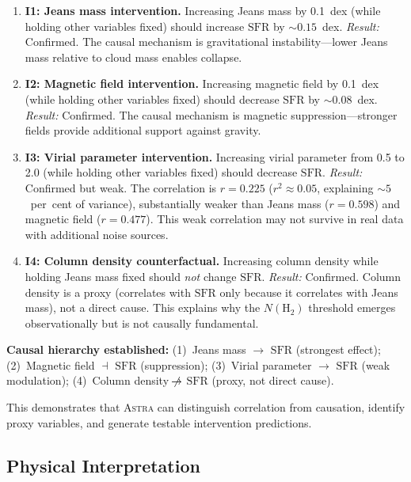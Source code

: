 \documentclass[fleqn,usenatbib]{mnras}
\newcommand{\astra}{\textsc{Astra}\xspace}
\newcommand{\sfr}{\mathrm{SFR}}
\newcommand{\nh}{N(\mathrm{H}_2)}
\begin{document}
\begin{enumerate}
  \item[(i)] \textbf{I1: Jeans mass intervention.}
  Increasing Jeans mass by 0.1~dex (while holding other variables fixed) should increase $\sfr$ by $\sim\!0.15$~dex. \emph{Result:} Confirmed. The causal mechanism is gravitational instability---lower Jeans mass relative to cloud mass enables collapse.

  \item[(ii)] \textbf{I2: Magnetic field intervention.}
  Increasing magnetic field by 0.1~dex (while holding other variables fixed) should decrease $\sfr$ by $\sim\!0.08$~dex. \emph{Result:} Confirmed. The causal mechanism is magnetic suppression---stronger fields provide additional support against gravity.

  \item[(iii)] \textbf{I3: Virial parameter intervention.}
  Increasing virial parameter from 0.5 to 2.0 (while holding other variables fixed) should decrease $\sfr$. \emph{Result:} Confirmed but weak. The correlation is $r = 0.225$ ($r^2 \approx 0.05$, explaining $\sim\!5$~per~cent of variance), substantially weaker than Jeans mass ($r = 0.598$) and magnetic field ($r = 0.477$). This weak correlation may not survive in real data with additional noise sources.

  \item[(iv)] \textbf{I4: Column density counterfactual.}
  Increasing column density while holding Jeans mass fixed should \emph{not} change $\sfr$. \emph{Result:} Confirmed. Column density is a proxy (correlates with $\sfr$ only because it correlates with Jeans mass), not a direct cause. This explains why the $\nh$ threshold emerges observationally but is not causally fundamental.
\end{enumerate}

\textbf{Causal hierarchy established:}
(1)~Jeans mass $\rightarrow$ $\sfr$ (strongest effect);
(2)~Magnetic field $\dashv$ $\sfr$ (suppression);
(3)~Virial parameter $\rightarrow$ $\sfr$ (weak modulation);
(4)~Column density $\not\!\rightarrow$ $\sfr$ (proxy, not direct cause).

This demonstrates that \astra can distinguish correlation from causation, identify proxy variables, and generate testable intervention predictions.

\subsection{Physical Interpretation}
\label{sec:tc6:interpretation}
\end{document}
